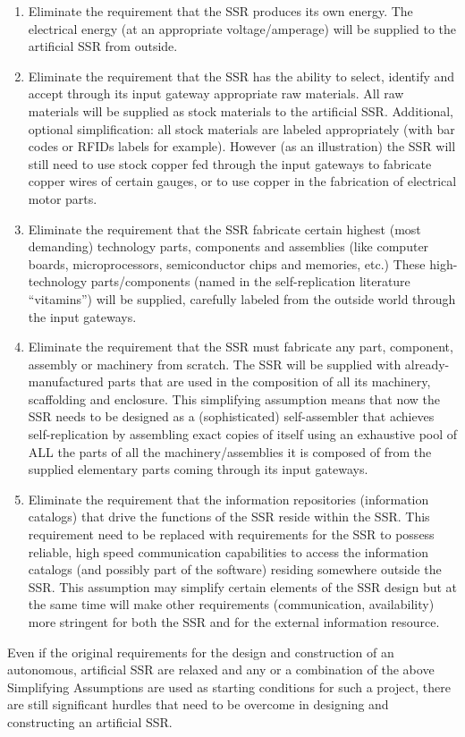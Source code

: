 \begin{enumerate}
\item Eliminate the requirement that the SSR produces its own energy.
The electrical energy (at an appropriate voltage/amperage) will be
supplied to the artificial SSR from outside.
\item Eliminate the requirement that the SSR has the ability to select,
identify and accept through its input gateway appropriate raw
materials. All raw materials will be supplied as stock materials to the
artificial SSR. Additional, optional simplification: all stock
materials are labeled appropriately (with bar codes or RFIDs labels for
example). However (as an illustration) the SSR will still need to use
stock copper fed through the input gateways to fabricate copper wires
of certain gauges, or to use copper in the fabrication of electrical
motor parts.
\item Eliminate the requirement that the SSR fabricate certain highest
(most demanding) technology parts, components and assemblies (like
computer boards, microprocessors, semiconductor chips and memories,
etc.) These high-technology parts/components (named in the
self-replication literature “vitamins”) will be supplied, carefully
labeled from the outside world through the input gateways.
\item Eliminate the requirement that the SSR must fabricate any part,
component, assembly or machinery from scratch. The SSR will be supplied
with already-manufactured parts that are used in the composition of all
its machinery, scaffolding and enclosure. This simplifying assumption
means that now the SSR needs to be designed as a (sophisticated)
self-assembler that achieves self-replication by assembling exact
copies of itself using an exhaustive pool of ALL the parts of all the
machinery/assemblies it is composed of from the supplied elementary
parts coming through its input gateways.
\item Eliminate the requirement that the information repositories
(information catalogs) that drive the functions of the SSR reside
within the SSR. This requirement need to be replaced with requirements
for the SSR to possess reliable, high speed communication capabilities
to access the information catalogs (and possibly part of the software)
residing somewhere outside the SSR. This assumption may simplify
certain elements of the SSR design but at the same time will make other
requirements (communication, availability) more stringent for both the
SSR and for the external information resource. 
\end{enumerate}
Even if the original requirements for the design and construction of an
autonomous, artificial SSR are relaxed and any or a combination of the
above Simplifying Assumptions are used as starting conditions for such
a project, there are still significant hurdles that need to be overcome
in designing and constructing an artificial SSR.


